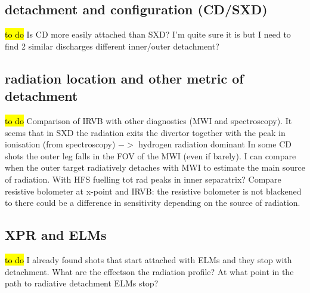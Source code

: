 \subsection{detachment and configuration (CD/SXD)}
\hl{to do}
Is CD more easily attached than SXD? I'm quite sure it is but I need to find 2 similar discharges
different inner/outer detachment?
\subsection{radiation location and other metric of detachment}
\hl{to do}
Comparison of IRVB with other diagnostics (MWI and spectroscopy). It seems that in SXD the radiation exits the divertor together with the peak in ionisation (from spectroscopy) $->$ hydrogen radiation dominant
In some CD shots the outer leg falls in the FOV of the MWI (even if barely). I can compare when the outer target radiatively detaches with MWI to estimate the main source of radiation.
With HFS fuelling tot rad peaks in inner separatrix?
Compare resistive bolometer at x-point and IRVB: the resistive bolometer is not blackened to there could be a difference in sensitivity depending on the source of radiation.
\subsection{XPR and ELMs}
\hl{to do}
I already found shots that start attached with ELMs and they stop with detachment. What are the effectson the radiation profile? At what point in the path to radiative detachment ELMs stop?
